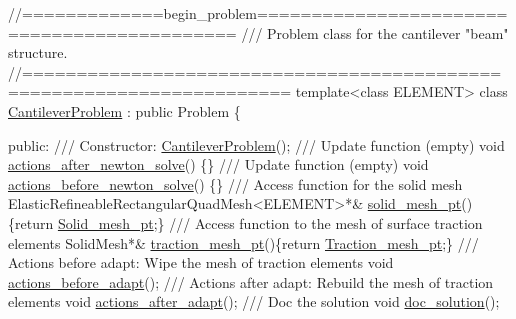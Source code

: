  
\begin{DoxyCodeInclude}
\textcolor{comment}{//=============begin\_problem============================================ }
\textcolor{comment}{/// Problem class for the cantilever "beam" structure.}
\textcolor{comment}{}\textcolor{comment}{//====================================================================== }
\textcolor{keyword}{template}<\textcolor{keyword}{class} ELEMENT>
\textcolor{keyword}{class }\hyperlink{classCantileverProblem}{CantileverProblem} : \textcolor{keyword}{public} Problem
\{

\textcolor{keyword}{public}:
\textcolor{comment}{}
\textcolor{comment}{ /// Constructor:}
\textcolor{comment}{} \hyperlink{classCantileverProblem_abba97fc4b8402bc0363fdf16322f6572}{CantileverProblem}();
 \textcolor{comment}{}
\textcolor{comment}{ /// Update function (empty)}
\textcolor{comment}{} \textcolor{keywordtype}{void} \hyperlink{classCantileverProblem_a4a70a4328d287aaa15c7811562122013}{actions\_after\_newton\_solve}() \{\}
\textcolor{comment}{}
\textcolor{comment}{ /// Update function (empty)}
\textcolor{comment}{} \textcolor{keywordtype}{void} \hyperlink{classCantileverProblem_a293902b825898ce043ffce3f0691f5a5}{actions\_before\_newton\_solve}() \{\}
\textcolor{comment}{}
\textcolor{comment}{ /// Access function for the solid mesh}
\textcolor{comment}{} ElasticRefineableRectangularQuadMesh<ELEMENT>*& \hyperlink{classCantileverProblem_a26843782873897ee5e45647d17204b86}{solid\_mesh\_pt}() 
  \{\textcolor{keywordflow}{return} \hyperlink{classCantileverProblem_a263ff19e4aa0fa4391582242763f08f1}{Solid\_mesh\_pt};\} 
\textcolor{comment}{}
\textcolor{comment}{ /// Access function to the mesh of surface traction elements}
\textcolor{comment}{} SolidMesh*& \hyperlink{classCantileverProblem_af9e9b4a4686ac29bc7e4ef5d6baeae5a}{traction\_mesh\_pt}()\{\textcolor{keywordflow}{return} \hyperlink{classCantileverProblem_a52485434aab5d653010c48a0b0f89088}{Traction\_mesh\_pt};\} 
\textcolor{comment}{}
\textcolor{comment}{ /// Actions before adapt: Wipe the mesh of traction elements}
\textcolor{comment}{} \textcolor{keywordtype}{void} \hyperlink{classCantileverProblem_a50f8964219c507562945655e0ed5fc23}{actions\_before\_adapt}();
\textcolor{comment}{}
\textcolor{comment}{ /// Actions after adapt: Rebuild the mesh of traction elements}
\textcolor{comment}{} \textcolor{keywordtype}{void} \hyperlink{classCantileverProblem_af4d135ace3eac657b38de362e1644c75}{actions\_after\_adapt}();
\textcolor{comment}{}
\textcolor{comment}{ /// Doc the solution}
\textcolor{comment}{} \textcolor{keywordtype}{void} \hyperlink{classCantileverProblem_a7571348f8724e71be4e67dc64cea3877}{doc\_solution}();

\end{DoxyCodeInclude}


